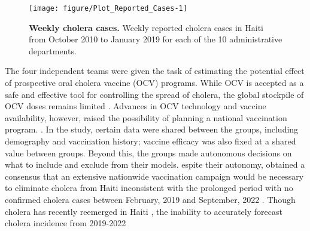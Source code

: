 \documentclass[10pt,letterpaper]{article}\usepackage[]{graphicx}\usepackage[table]{xcolor}
\makeatletter
\def\maxwidth{ %
  \ifdim\Gin@nat@width>\linewidth
    \linewidth
  \else
    \Gin@nat@width
  \fi
}
\newenvironment{knitrout}{}{} %
\newcommand\figTitle{\bf}
\makeatother
\begin{document}
\begin{figure}[!h]
\begin{knitrout}
\color{fgcolor}
\texttt{[image: figure/Plot\_Reported\_Cases-1]} 
\end{knitrout}
\caption{\label{fig:CholeraData}
{\figTitle Weekly cholera cases.}
Weekly reported cholera cases in Haiti from October 2010 to January 2019 for each of the 10 administrative departments.
}
\end{figure}

The four independent teams were given the task of estimating the
potential effect of prospective oral cholera vaccine (OCV) programs.
While OCV is accepted as a safe and effective tool for controlling the spread of cholera, the global stockpile of OCV doses remains limited \cite{pezzoli20}.
Advances in OCV technology and vaccine availability, however, raised the possibility of planning a national vaccination program.
.
In the  study, certain data were shared between the groups, including demography and vaccination history; vaccine efficacy was also fixed at a shared value between groups.
Beyond this, the groups made autonomous decisions on what to include and exclude from their models.
espite their autonomy,  obtained a consensus that an extensive nationwide vaccination campaign would be necessary to eliminate cholera from Haiti
  inconsistent with the prolonged period with no confirmed cholera cases between February, 2019 and September, 2022 \cite{trevisin22}.
Though cholera has recently reemerged in Haiti \cite{rubin22,PAHO23}, the inability to accurately forecast cholera incidence from 2019-2022 
\end{document}
